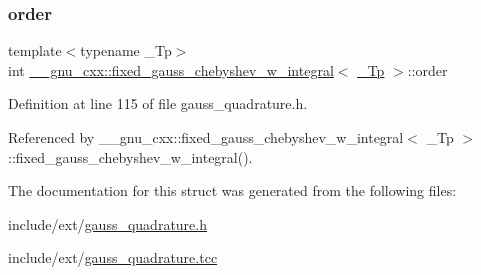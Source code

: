 \subsubsection{\texorpdfstring{order}{order}}
{\footnotesize\ttfamily template$<$typename \+\_\+\+Tp$>$ \\
int \hyperlink{struct____gnu__cxx_1_1fixed__gauss__chebyshev__w__integral}{\+\_\+\+\_\+gnu\+\_\+cxx\+::fixed\+\_\+gauss\+\_\+chebyshev\+\_\+w\+\_\+integral}$<$ \hyperlink{namespace____gnu__cxx_a3b19a9c800ca194374ef9172290f7d79}{\+\_\+\+Tp} $>$\+::order}



Definition at line 115 of file gauss\+\_\+quadrature.\+h.



Referenced by \+\_\+\+\_\+gnu\+\_\+cxx\+::fixed\+\_\+gauss\+\_\+chebyshev\+\_\+w\+\_\+integral$<$ \+\_\+\+Tp $>$\+::fixed\+\_\+gauss\+\_\+chebyshev\+\_\+w\+\_\+integral().



The documentation for this struct was generated from the following files\+:\begin{DoxyCompactItemize}
\item 
include/ext/\hyperlink{gauss__quadrature_8h}{gauss\+\_\+quadrature.\+h}\item 
include/ext/\hyperlink{gauss__quadrature_8tcc}{gauss\+\_\+quadrature.\+tcc}\end{DoxyCompactItemize}

